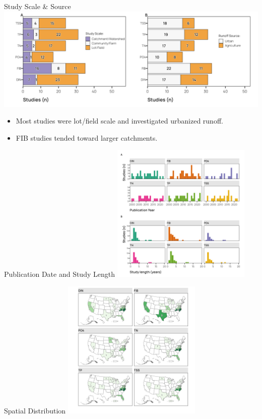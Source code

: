 \documentclass[
  ignorenonframetext,
  aspectratio=169,
]{beamer}
\providecommand{\tightlist}{%
  \setlength{\itemsep}{0pt}\setlength{\parskip}{0pt}}\usepackage{longtable,booktabs,array}
\begin{document}
\begin{frame}{Study Scale \& Source}
\label{study-scale-source}
\includegraphics[width=1\textwidth,height=\textheight]{Schramm-UCOWR-2024_files/figure-beamer/p1-1.png}

\begin{itemize}
\tightlist
\item
  Most studies were lot/field scale and investigated urbanized runoff.
\item
  FIB studies tended toward larger catchments.
\end{itemize}
\end{frame}

\begin{frame}{Publication Date and Study Length}
\label{publication-date-and-study-length}
\includegraphics[width=0.5\textwidth,height=\textheight]{Schramm-UCOWR-2024_files/figure-beamer/p2-1.png}
\end{frame}

\begin{frame}{Spatial Distribution}
\label{spatial-distribution}
\includegraphics[width=0.5\textwidth,height=\textheight]{Schramm-UCOWR-2024_files/figure-beamer/p3-1.png}
\end{frame}
\end{document}
